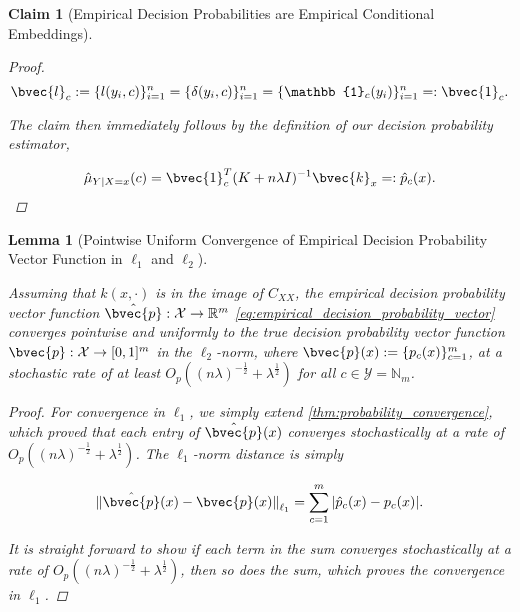 \documentclass{article}
\newtheorem{lemma}{Lemma}[theorem]
\newtheorem{claim}{Claim}[theorem]
\begin{document}
\begin{claim}[Empirical Decision Probabilities are Empirical Conditional Embeddings]
\begin{proof}
			\begin{equation}
				\bvec{l}_{c} := \{l(y_{i}, c)\}_{i = 1}^{n} = \{\delta(y_{i}, c)\}_{i = 1}^{n} = \{\mathbb{1}_{c}(y_{i})\}_{i = 1}^{n} =: \bvec{1}_{c}.
			\end{equation}
			
			The claim then immediately follows by the definition of our decision probability estimator,
			
			\begin{equation}
				\hat{\mu}_{Y | X = x}(c) = \bvec{1}_{c}^{T} (K + n \lambda I)^{-1} \bvec{k}_{x} =: \hat{p}_{c}(x).
			\end{equation}
		\end{proof}
		
	\end{claim}

	\begin{lemma}[Pointwise Uniform Convergence of Empirical Decision Probability Vector Function in $\ell_{1}$ and $\ell_{2}$]
	\label{thm:probability_vector_convergence} 
	
		Assuming that $k(x, \cdot)$ is in the image of $C_{XX}$, the empirical decision probability vector function $\hat{\bvec{p}} : \mathcal{X} \to \mathbb{R}^{m}$ \eqref{eq:empirical_decision_probability_vector} converges pointwise and uniformly to the true decision probability vector function $\bvec{p} : \mathcal{X} \to [0, 1]^{m}$ in the $\ell_{2}$-norm, where $\bvec{p}(x) := \{p_{c}(x)\}_{c = 1}^{m}$, at a stochastic rate of at least $O_{p}((n \lambda)^{-\frac{1}{2}} + \lambda^{\frac{1}{2}})$ for all $c \in \mathcal{Y} = \mathbb{N}_{m}$.
		
		\begin{proof}
			For convergence in $\ell_{1}$, we simply extend \cref{thm:probability_convergence}, which proved that each entry of $\hat{\bvec{p}}(x)$ converges stochastically at a rate of $O_{p}((n \lambda)^{-\frac{1}{2}} + \lambda^{\frac{1}{2}})$. The $\ell_{1}$-norm distance is simply
			
			\begin{equation}
				{\lVert \hat{\bvec{p}}(x) - \bvec{p}(x) \rVert}_{\ell_{1}} = \sum_{c = 1}^{m} | \hat{p}_{c}(x) - p_{c}(x) |.
			\end{equation}
			
			It is straight forward to show if each term in the sum converges stochastically at a rate of $O_{p}((n \lambda)^{-\frac{1}{2}} + \lambda^{\frac{1}{2}})$, then so does the sum, which proves the convergence in $\ell_{1}$.
			

\end{proof}
\end{lemma}
\end{document}
